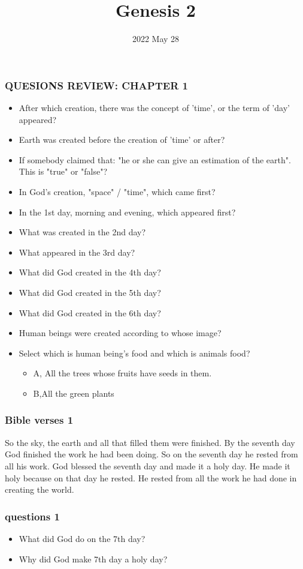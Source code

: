 \documentclass{beamer}
\title{Genesis 2}
\author{}
\institute{}
\date{2022 May 28}
\begin{document}
\frame{\titlepage}


\begin{frame}
\frametitle{QUESIONS REVIEW: CHAPTER 1}
 \begin{itemize}
\item After which creation, there was the concept of 'time', or the term of 'day' appeared? 
\item Earth was created before the creation of 'time' or after?
\item If somebody claimed that: "he or she can give an estimation of the earth". This is "true" or "false"?
\item In God's creation, "space" / "time", which came first?
\item In the 1st day, morning and evening, which appeared first?

\item What was created in the 2nd day?
\item What appeared in the 3rd day?
\item What did God created in the 4th day?
\item What did God created in the 5th day?
\item What did God created in the 6th day?

\item Human beings were created according to whose image?
\item Select which is human being’s food and which is animals food?
\begin{itemize}
\item A, All the trees whose fruits have seeds in them. 
\item B,All the green plants
\end{itemize}
\end{itemize}

\end{frame}




\begin{frame}
\frametitle{Bible verses 1}
So the sky, the earth and all that filled them were finished. By the seventh day God finished the work he had been doing. So on the seventh day he rested from all his work.  God blessed the seventh day and made it a holy day. He made it holy because on that day he rested. He rested from all the work he had done in creating the world.
\end{frame}


\begin{frame}
\frametitle{questions 1}
\begin{itemize}
\item What did God do on the 7th day?
\item Why did God make 7th day a holy day?
\end{itemize}
\end{frame}
\end{document}
